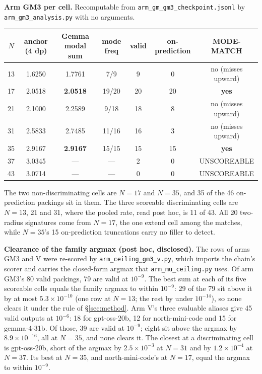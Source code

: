 \textbf{Arm GM3 per cell.} Recomputable from \texttt{arm\_gm\_gm3\_checkpoint.jsonl} by
\texttt{arm\_gm3\_analysis.py} with no arguments.

\begin{center}
\begin{tabular}{@{}ccccccc@{}}
\toprule
$N$ & anchor (4 dp) & Gemma modal sum & mode freq & valid & on-prediction & MODE-MATCH \\
\midrule
13 & 1.6250 & 1.7761 & 7/9 & 9 & 0 & no (misses upward) \\
17 & 2.0518 & \textbf{2.0518} & 19/20 & 20 & 20 & \textbf{yes} \\
21 & 2.1000 & 2.2589 & 9/18 & 18 & 8 & no (misses upward) \\
31 & 2.5833 & 2.7485 & 11/16 & 16 & 3 & no (misses upward) \\
35 & 2.9167 & \textbf{2.9167} & 15/15 & 15 & 15 & \textbf{yes} \\
37 & 3.0345 & --- & --- & 2 & 0 & UNSCOREABLE \\
43 & 3.0714 & --- & --- & 0 & 0 & UNSCOREABLE \\
\bottomrule
\end{tabular}
\end{center}

The two non-discriminating cells are $N = 17$ and $N = 35$, and 35 of the 46 on-prediction
packings sit in them. The three scoreable discriminating cells are $N = 13$, 21 and 31, where
the pooled rate, read post hoc, is 11 of 43. All 20 two-radius signatures come from $N = 17$, the one extend
cell among the matches, while $N = 35$'s 15 on-prediction truncations carry no filler to
detect.

\textbf{Clearance of the family argmax (post hoc, disclosed).} The rows of arms GM3 and V
were re-scored by \texttt{arm\_ceiling\_gm3\_v.py}, which imports the chain's scorer and
carries the closed-form argmax that \texttt{arm\_mu\_ceiling.py} uses. Of arm GM3's 80 valid
packings, 79 are valid at $10^{-9}$. The best sum at each of its five scoreable cells equals
the family argmax to within $10^{-9}$: 29 of the 79 sit above it by at most
$5.3\times10^{-10}$ (one row at $N = 13$; the rest by under $10^{-14}$), so none clears it
under the rule of \S\ref{sec:method}. Arm V's three
evaluable aliases give 45 valid outputs at $10^{-6}$: 18 for gpt-oss-20b, 12 for
north-mini-code and 15 for gemma-4-31b. Of those, 39 are valid at $10^{-9}$; eight sit above
the argmax by $8.9\times10^{-16}$, all at $N = 35$, and none clears it. The closest at a
discriminating cell is gpt-oss-20b, short of the argmax by
$2.5\times10^{-3}$ at $N = 31$ and by $1.2\times10^{-4}$ at $N = 37$. Its best at $N = 35$,
and north-mini-code's at $N = 17$, equal the argmax to within $10^{-9}$.

